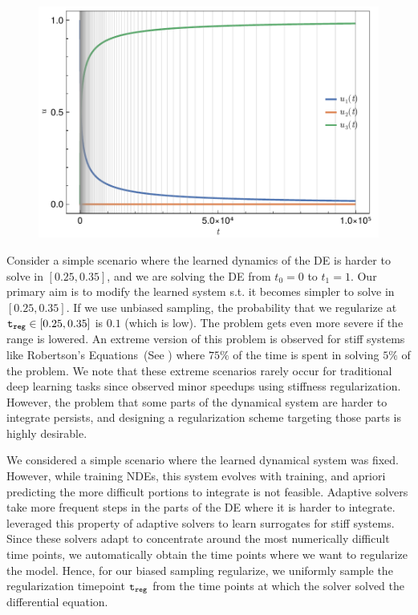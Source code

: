 \begin{figure}
  \centering
  \includegraphics[width=0.95\linewidth]{../figures/local_regularizing_neural_des/biased_sampling_robertson_example}
  \label{fig:robertson_stiff_system}
\end{figure}


Consider a simple scenario where the learned dynamics of the DE is harder to solve in $\left[0.25, 0.35\right]$, and we are solving the DE from $t_0 = 0$ to $t_1 = 1$. Our primary aim is to modify the learned system s.t. it becomes simpler to solve in $\left[0.25, 0.35\right]$. If we use unbiased sampling, the probability that we regularize at $\texttt{t}_{\texttt{reg}} \in \left[0.25, 0.35\right]$ is $0.1$ (which is low). The problem gets even more severe if the range is lowered. An extreme version of this problem is observed for stiff systems like Robertson's Equations~(See ) where $75\%$ of the time is spent in solving $5\%$ of the problem. We note that these extreme scenarios rarely occur for traditional deep learning tasks since \citet{pal2021opening} observed minor speedups using stiffness regularization. However, the problem that some parts of the dynamical system are harder to integrate persists, and designing a regularization scheme targeting those parts is highly desirable.

We considered a simple scenario where the learned dynamical system was fixed. However, while training NDEs, this system evolves with training, and apriori predicting the more difficult portions to integrate is not feasible. Adaptive solvers take more frequent steps in the parts of the DE where it is harder to integrate. \citet{anantharaman2020accelerating} leveraged this property of adaptive solvers to learn surrogates for stiff systems. Since these solvers adapt to concentrate around the most numerically difficult time points, we automatically obtain the time points where we want to regularize the model. Hence, for our biased sampling regularize, we uniformly sample the regularization timepoint $\texttt{t}_{\texttt{reg}}$ from the time points at which the solver solved the differential equation.

